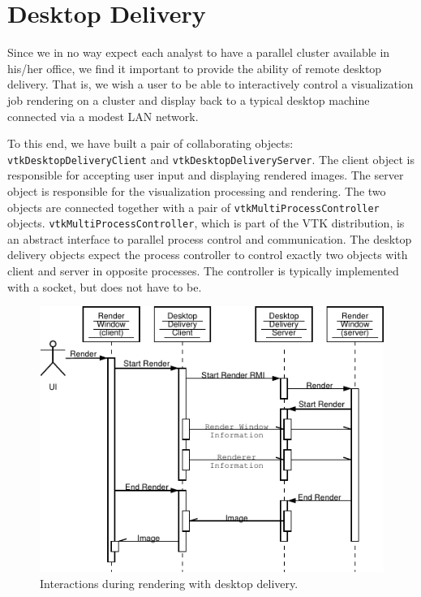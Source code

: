 \documentclass[twocolumn]{article}
\newcommand{\cidentifier}[1]{\texttt{#1}}
\begin{document}
  \section{Desktop Delivery}
  \label{sec:desktop_delivery}

  Since we in no way expect each analyst to have a parallel cluster
  available in his/her office, we find it important to provide the ability
  of remote desktop delivery.  That is, we wish a user to be able to
  interactively control a visualization job rendering on a cluster and
  display back to a typical desktop machine connected via a modest LAN
  network.

  To this end, we have built a pair of collaborating objects:
  \cidentifier{vtk\-Desktop\-Delivery\-Client} and
  \cidentifier{vtk\-Desktop\-Delivery\-Server}.  The client object is
  responsible for accepting user input and displaying rendered images.  The
  server object is responsible for the visualization processing and
  rendering.  The two objects are connected together with a pair of
  \cidentifier{vtk\-Multi\-Process\-Controller} objects.
  \cidentifier{vtk\-Multi\-Process\-Controller}, which is part of the VTK
  distribution, is an abstract interface to parallel process control and
  communication.  The desktop delivery objects expect the process
  controller to control exactly two objects with client and server in
  opposite processes.  The controller is typically implemented with a
  socket, but does not have to be.

  \begin{figure}[ht]
    \begin{center}
      \includegraphics[width=\linewidth]{images/DesktopDeliveryInteraction}
      \caption{Interactions during rendering with desktop delivery.}
      \label{fig:desktop_delivery_interaction}
    \end{center}
  \end{figure}
\end{document}
